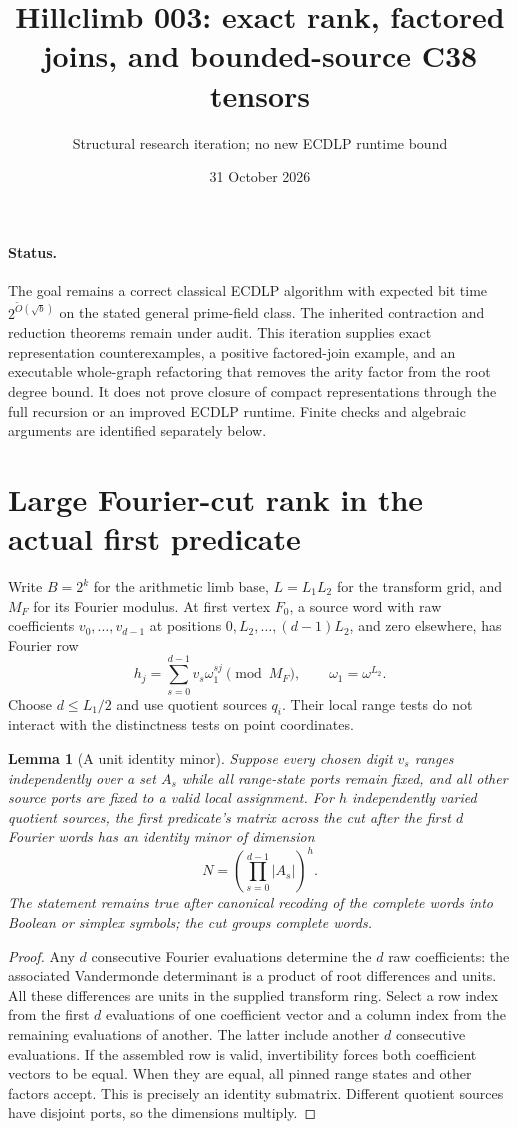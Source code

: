 \documentclass[11pt]{article}
\title{Hillclimb 003: exact rank, factored joins, and bounded-source C38 tensors}
\author{Structural research iteration; no new ECDLP runtime bound}
\date{31 October 2026}
\newtheorem{lemma}{Lemma}
\begin{document}
\maketitle

\paragraph{Status.}
The goal remains a correct classical ECDLP algorithm with expected bit
time $2^{\widetilde O(\sqrt b)}$ on the stated general prime-field class.
The inherited contraction and reduction theorems remain under audit.
This iteration supplies exact representation counterexamples, a positive
factored-join example, and an executable whole-graph refactoring that
removes the arity factor from the root degree bound. It does not prove
closure of compact representations through the full recursion or an
improved ECDLP runtime. Finite checks and algebraic arguments are identified
separately below.

\section{Large Fourier-cut rank in the actual first predicate}
Write $B=2^k$ for the arithmetic limb base, $L=L_1L_2$ for the
transform grid, and $M_F$ for its Fourier modulus. At first vertex $F_0$,
a source word with raw coefficients $v_0,\ldots,v_{d-1}$ at positions
$0,L_2,\ldots,(d-1)L_2$, and zero elsewhere, has Fourier row
\[
 h_j=\sum_{s=0}^{d-1}v_s\omega_1^{sj}\pmod{M_F},\qquad
 \omega_1=\omega^{L_2}.
\]
Choose $d\le L_1/2$ and use quotient sources $q_i$. Their local range
tests do not interact with the distinctness tests on point coordinates.

\begin{lemma}[A unit identity minor]
Suppose every chosen digit $v_s$ ranges independently over a set $A_s$
while all range-state ports remain fixed, and all other source ports are
fixed to a valid local assignment. For $h$ independently varied quotient
sources, the first predicate's matrix across the cut after the first $d$
Fourier words has an identity minor of dimension
\[
 N=\left(\prod_{s=0}^{d-1}|A_s|\right)^h.
\]
The statement remains true after canonical recoding of the complete words
into Boolean or simplex symbols; the cut groups complete words.
\end{lemma}
\begin{proof}
Any $d$ consecutive Fourier evaluations determine the $d$ raw coefficients:
the associated Vandermonde determinant is a product of root differences
and units. All these differences are units in the supplied transform
ring. Select a row index from the first $d$ evaluations of one coefficient
vector and a column index from the remaining evaluations of another.
The latter include another $d$ consecutive evaluations. If the assembled
row is valid, invertibility forces both coefficient vectors to be equal.
When they are equal, all pinned range states and other factors accept.
This is precisely an identity submatrix. Different quotient sources have
disjoint ports, so the dimensions multiply.
\end{proof}
\end{document}
